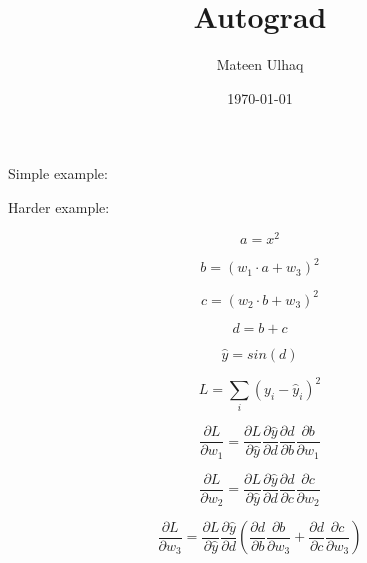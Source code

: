 \documentclass[12pt]{extarticle}
\title{Autograd}
\author{Mateen Ulhaq}
\date{\today}
\begin{document}
\maketitle


Simple example:





Harder example:

$$ a = x^2 $$

$$ b = (w_1 \cdot a + w_3)^2 $$

$$ c = (w_2 \cdot b + w_3)^2 $$

$$ d = b + c $$

$$ \hat{y} = sin(d) $$

$$ L = \sum_i (y_i - \hat{y}_i)^2 $$

$$ \frac{\partial L}{\partial w_1} = \frac{\partial L}{\partial \hat{y}} \frac{\partial \hat{y}}{\partial d} \frac{\partial d}{\partial b} \frac{\partial b}{\partial w_1} $$

$$ \frac{\partial L}{\partial w_2} = \frac{\partial L}{\partial \hat{y}} \frac{\partial \hat{y}}{\partial d} \frac{\partial d}{\partial c} \frac{\partial c}{\partial w_2} $$

$$ \frac{\partial L}{\partial w_3} = \frac{\partial L}{\partial \hat{y}} \frac{\partial \hat{y}}{\partial d} \left( \frac{\partial d}{\partial b} \frac{\partial b}{\partial w_3} + \frac{\partial d}{\partial c} \frac{\partial c}{\partial w_3} \right) $$
\end{document}
